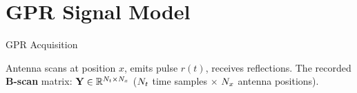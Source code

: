 
\section{GPR Signal Model}

\begin{frame}{GPR Acquisition}
  \begin{center}
    
  \end{center}

  \vspace{-0.4em}

  \begin{shibuiframe}{ }
    \centering
    Antenna scans at position $x$, emits pulse $r(t)$, receives reflections.
    \quad The recorded \textbf{B-scan} matrix:
    $\mathbf{Y} \in \mathbb{R}^{N_t \times N_x}$
    \quad ($N_t$ time samples $\times$ $N_x$ antenna positions).
  \end{shibuiframe}
\end{frame}

